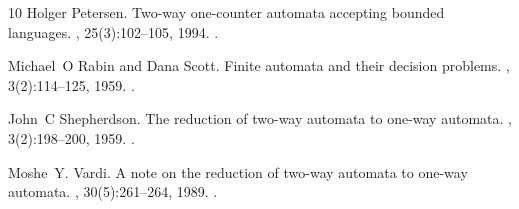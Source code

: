 \documentclass[11pt,a4paper]{amsart}
\theoremstyle{definition}
\begin{document}
\begin{thebibliography}{10}
Holger Petersen.
\newblock Two-way one-counter automata accepting bounded languages.
, 25(3):102--105, 1994.
\newblock \href {https://doi.org/10.1145/193820.193835}
  {}.

Michael~O Rabin and Dana Scott.
\newblock Finite automata and their decision problems.
, 3(2):114--125, 1959.
\newblock \href {https://doi.org/10.1147/rd.32.0114}
  {}.

John~C Shepherdson.
\newblock The reduction of two-way automata to one-way automata.
, 3(2):198--200, 1959.
\newblock \href {https://doi.org/10.1147/rd.32.0198}
  {}.

Moshe~Y. Vardi.
\newblock A note on the reduction of two-way automata to one-way automata.
, 30(5):261--264, 1989.
\newblock \href {https://doi.org/10.1016/0020-0190(89)90205-6}
  {}.

\end{thebibliography}
\end{document}
